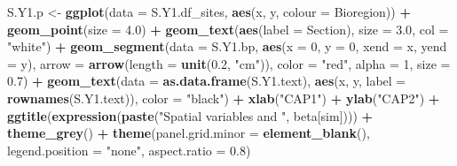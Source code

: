 \documentclass[10pt,A4,]{article}
\newenvironment{Shaded}{\begin{snugshade}}{\end{snugshade}}
\newcommand{\KeywordTok}[1]{\textcolor[rgb]{0.13,0.29,0.53}{\textbf{#1}}}
\newcommand{\DataTypeTok}[1]{\textcolor[rgb]{0.13,0.29,0.53}{#1}}
\newcommand{\DecValTok}[1]{\textcolor[rgb]{0.00,0.00,0.81}{#1}}
\newcommand{\FloatTok}[1]{\textcolor[rgb]{0.00,0.00,0.81}{#1}}
\newcommand{\StringTok}[1]{\textcolor[rgb]{0.31,0.60,0.02}{#1}}
\newcommand{\OperatorTok}[1]{\textcolor[rgb]{0.81,0.36,0.00}{\textbf{#1}}}
\newcommand{\NormalTok}[1]{#1}
\begin{document}
\begin{Shaded}
\begin{Highlighting}[]
{{\NormalTok{S.Y1.p <-}\StringTok{ }\KeywordTok{ggplot}\NormalTok{(}\DataTypeTok{data =}\NormalTok{ S.Y1.df_sites, }\KeywordTok{aes}\NormalTok{(x, y, }\DataTypeTok{colour =}\NormalTok{ Bioregion)) }\OperatorTok{+}\StringTok{ }
\StringTok{  }\KeywordTok{geom_point}\NormalTok{(}\DataTypeTok{size =} \FloatTok{4.0}\NormalTok{) }\OperatorTok{+}\StringTok{ }
\StringTok{  }\KeywordTok{geom_text}\NormalTok{(}\KeywordTok{aes}\NormalTok{(}\DataTypeTok{label =}\NormalTok{ Section), }\DataTypeTok{size =} \FloatTok{3.0}\NormalTok{, }\DataTypeTok{col =} \StringTok{"white"}\NormalTok{) }\OperatorTok{+}\StringTok{ }
\StringTok{  }\KeywordTok{geom_segment}\NormalTok{(}\DataTypeTok{data =}\NormalTok{ S.Y1.bp, }
               \KeywordTok{aes}\NormalTok{(}\DataTypeTok{x =} \DecValTok{0}\NormalTok{, }\DataTypeTok{y =} \DecValTok{0}\NormalTok{, }\DataTypeTok{xend =}\NormalTok{ x, }\DataTypeTok{yend =}\NormalTok{ y),}
               \DataTypeTok{arrow =} \KeywordTok{arrow}\NormalTok{(}\DataTypeTok{length =} \KeywordTok{unit}\NormalTok{(}\FloatTok{0.2}\NormalTok{, }\StringTok{"cm"}\NormalTok{)), }
               \DataTypeTok{color =} \StringTok{"red"}\NormalTok{, }\DataTypeTok{alpha =} \DecValTok{1}\NormalTok{, }\DataTypeTok{size =} \FloatTok{0.7}\NormalTok{) }\OperatorTok{+}
\StringTok{  }\KeywordTok{geom_text}\NormalTok{(}\DataTypeTok{data =} \KeywordTok{as.data.frame}\NormalTok{(S.Y1.text), }
            \KeywordTok{aes}\NormalTok{(x, y, }\DataTypeTok{label =} \KeywordTok{rownames}\NormalTok{(S.Y1.text)),}
            \DataTypeTok{color =} \StringTok{"black"}\NormalTok{) }\OperatorTok{+}
\StringTok{  }\KeywordTok{xlab}\NormalTok{(}\StringTok{"CAP1"}\NormalTok{) }\OperatorTok{+}\StringTok{ }\KeywordTok{ylab}\NormalTok{(}\StringTok{"CAP2"}\NormalTok{) }\OperatorTok{+}\StringTok{ }
\StringTok{  }\KeywordTok{ggtitle}\NormalTok{(}\KeywordTok{expression}\NormalTok{(}\KeywordTok{paste}\NormalTok{(}\StringTok{"Spatial variables and "}\NormalTok{, beta[sim]))) }\OperatorTok{+}
\StringTok{  }\KeywordTok{theme_grey}\NormalTok{() }\OperatorTok{+}
\StringTok{  }\KeywordTok{theme}\NormalTok{(}\DataTypeTok{panel.grid.minor =} \KeywordTok{element_blank}\NormalTok{(),}
        \DataTypeTok{legend.position =} \StringTok{"none"}\NormalTok{,}
        \DataTypeTok{aspect.ratio =} \FloatTok{0.8}\NormalTok{)}

}}
\end{Highlighting}
\end{Shaded}
\end{document}
